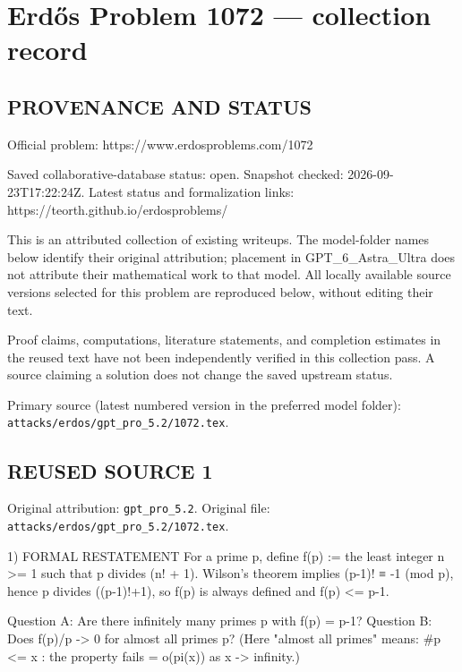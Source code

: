 \section*{Erd\H{o}s Problem 1072 --- collection record}

\subsection*{PROVENANCE AND STATUS}
Official problem: https://www.erdosproblems.com/1072

Saved collaborative-database status: open.
Snapshot checked: 2026-09-23T17:22:24Z.
Latest status and formalization links: https://teorth.github.io/erdosproblems/

This is an attributed collection of existing writeups. The model-folder names below identify their original attribution; placement in GPT\_6\_Astra\_Ultra does not attribute their mathematical work to that model. All locally available source versions selected for this problem are reproduced below, without editing their text.

Proof claims, computations, literature statements, and completion estimates in the reused text have not been independently verified in this collection pass. A source claiming a solution does not change the saved upstream status.

Primary source (latest numbered version in the preferred model folder): \texttt{attacks/erdos/gpt\_pro\_5.2/1072.tex}.

\subsection*{REUSED SOURCE 1}
Original attribution: \texttt{gpt\_pro\_5.2}.
Original file: \texttt{attacks/erdos/gpt\_pro\_5.2/1072.tex}.


1) FORMAL RESTATEMENT
For a prime p, define
  f(p) := the least integer n >= 1 such that p divides (n! + 1).
Wilson's theorem implies (p-1)! ≡ -1 (mod p), hence p divides ((p-1)!+1), so f(p) is always defined and f(p) <= p-1.

Question A: Are there infinitely many primes p with f(p) = p-1?
Question B: Does f(p)/p -> 0 for almost all primes p?
(Here "almost all primes" means: #{p <= x : the property fails} = o(pi(x)) as x -> infinity.)

